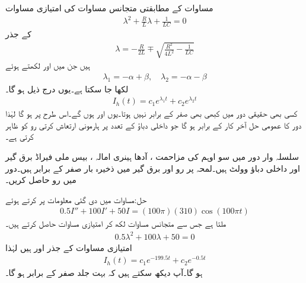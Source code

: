 مساوات  کے مطابقتی متجانس مساوات کی امتیازی مساوات
\begin{align*}
\lambda^2+\frac{R}{L}\lambda+\frac{1}{LC}=0
\end{align*}
کے جذر
\begin{align*}
\lambda=-\frac{R}{2L}\mp \sqrt{\frac{R^2}{4L^2}-\frac{1}{LC}}
\end{align*}
ہیں جن میں  اور  لکھتے ہوئے
\begin{align*}
\lambda_1=-\alpha+\beta, \quad \lambda_2=-\alpha-\beta
\end{align*}
لکھا جا سکتا ہے۔یوں  درج ذیل ہو گا۔
\begin{align*}
I_h(t)=c_1e^{\lambda_1 t}+c_2 e^{\lambda_2 t}
\end{align*}
کسی بھی حقیقی دور میں  کبھی بھی صفر کے برابر نہیں ہوتا۔یوں  اور  ہوں گے۔اس طرح  پر  ہو گا لہٰذا  دور کا عمومی حل آخر کار  کے برابر ہو گا جو داخلی دباؤ کے تعدد  پر ہارمونی ارتعاش کرتی رو کو ظاہر کرتی ہے۔ 

سلسلہ وار  دور میں سو اوہم کی مزاحمت ، آدھا ہینری امالہ  ، بیس ملی فیراڈ برق گیر
   اور داخلی دباؤ  وولٹ  ہیں۔لمحہ  پر رو اور برق گیر میں ذخیرہ بار صفر کے برابر ہیں۔دور میں رو  حاصل کریں۔

حل:مساوات  میں دی گئی معلومات پر کرتے ہوئے
\begin{align*}
0.5I''+100I'+50I=(100\pi) (310)\cos (100\pi t)
\end{align*}
ملتا ہے جس سے متجانس مساوات  لکھ کر امتیازی مساوات حاصل کرتے ہیں۔
\begin{align*}
0.5\lambda^2+100\lambda+50=0
\end{align*}
امتیازی مساوات کے جذر  اور  ہیں لہٰذا
\begin{align*}
I_h(t)=c_1e^{-199.5t}+c_2e^{-0.5t}
\end{align*}
ہو گا۔آپ دیکھ سکتے ہیں کہ  بہت جلد صفر کے برابر ہو گا۔

